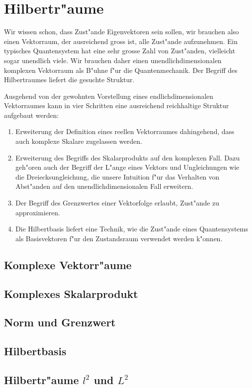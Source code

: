 \chapter{Hilbertr"aume}
\rhead{}
Wir wissen schon, dass Zust"ande Eigenvektoren sein sollen, wir brauchen
also einen Vektorraum, der ausreichend gross ist, alle Zust"ande aufzunehmen.
Ein typisches Quantensystem hat eine sehr grosse Zahl von Zust"anden,
vielleicht sogar unendlich viele.
Wir brauchen daher einen unendlichdimensionalen komplexen Vektorraum als
B"uhne f"ur die Quantenmechanik.
Der Begriff des Hilbertraumes liefert die gesuchte Struktur.

Ausgehend von der gewohnten Vorstellung eines endlichdimensionalen
Vektorraumes kann in vier Schritten eine ausreichend reichhaltige
Struktur aufgebaut werden:
\begin{enumerate}
\item Erweiterung der Definition eines reellen Vektorraumes dahingehend,
dass auch komplexe Skalare zugelassen werden.
\item Erweiterung des Begriffs des Skalarprodukts auf den komplexen Fall.
Dazu geh"oren auch der Begriff der L"ange eines Vektors und Ungleichungen
wie die Dreiecksungleichung, die unsere Intuition f"ur das Verhalten von
Abst"anden auf den unendlichdimensionalen Fall erweitern.
\item Der Begriff des Grenzwertes einer Vektorfolge erlaubt, Zust"ande
zu approximieren.
\item Die Hilbertbasis liefert eine Technik, wie die Zust"ande eines
Quantensystems als Basisvektoren f"ur den Zustandsraum verwendet werden
k"onnen.
\end{enumerate}

\section{Komplexe Vektorr"aume}
\section{Komplexes Skalarprodukt}
\section{Norm und Grenzwert}
\section{Hilbertbasis}
\section{Hilbertr"aume $l^2$ und $L^2$}
